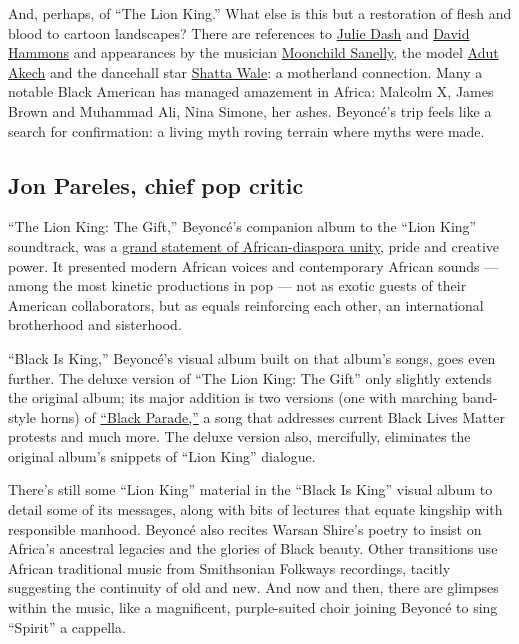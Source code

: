 And, perhaps, of ``The Lion King.'' What else is this but a restoration
of flesh and blood to cartoon landscapes? There are references to
\href{https://www.criterionchannel.com/daughters-of-the-dust}{Julie
Dash} and
\href{https://www.google.com/search?q=African+American+Flag+david+hammons\&client=safari\&rls=en\&sxsrf=ALeKk03IfUCPOgFtGYIYz_4RbNgFsPggpw:1596203835640\&source=lnms\&tbm=isch\&sa=X\&ved=2ahUKEwiX2PLU0vfqAhVsRN8KHVcvAb4Q_AUoAnoECBgQBA\&biw=1694\&bih=957\#imgrc=xTZg8oh2K3EHwM}{David
Hammons} and appearances by the musician
\href{https://www.youtube.com/watch?v=9RBsGd3eXBw}{Moonchild Sanelly},
the model \href{https://www.instagram.com/adutakech/?hl=en}{Adut Akech}
and the dancehall star
\href{https://en.wikipedia.org/wiki/Shatta_Wale}{Shatta Wale}: a
motherland connection. Many a notable Black American has managed
amazement in Africa: Malcolm X, James Brown and Muhammad Ali, Nina
Simone, her ashes. Beyoncé's trip feels like a search for confirmation:
a living myth roving terrain where myths were made.

\hypertarget{jon-pareles-chief-pop-critic}{%
\subsection{Jon Pareles, chief pop
critic}\label{jon-pareles-chief-pop-critic}}

``The Lion King: The Gift,'' Beyoncé's companion album to the ``Lion
King'' soundtrack, was a
\href{https://www.nytimes.com/2019/07/24/arts/music/beyonce-the-lion-king-the-gift-review.html}{grand
statement of African-diaspora unity}, pride and creative power. It
presented modern African voices and contemporary African sounds ---
among the most kinetic productions in pop --- not as exotic guests of
their American collaborators, but as equals reinforcing each other, an
international brotherhood and sisterhood.

``Black Is King,'' Beyoncé's visual album built on that album's songs,
goes even further. The deluxe version of ``The Lion King: The Gift''
only slightly extends the original album; its major addition is two
versions (one with marching band-style horns) of
\href{https://www.nytimes.com/2020/06/26/arts/music/playlist-beyonce-prince.html}{``Black
Parade,''} a song that addresses current Black Lives Matter protests and
much more. The deluxe version also, mercifully, eliminates the original
album's snippets of ``Lion King'' dialogue.

There's still some ``Lion King'' material in the ``Black Is King''
visual album to detail some of its messages, along with bits of lectures
that equate kingship with responsible manhood. Beyoncé also recites
Warsan Shire's poetry to insist on Africa's ancestral legacies and the
glories of Black beauty. Other transitions use African traditional music
from Smithsonian Folkways recordings, tacitly suggesting the continuity
of old and new. And now and then, there are glimpses within the music,
like a magnificent, purple-suited choir joining Beyoncé to sing
``Spirit'' a cappella.

